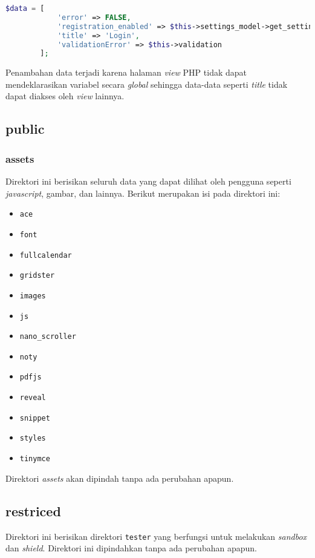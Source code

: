 \begin{lstlisting}[language=PHP, caption=Penambahan kode pada \textit{controller} \texttt{Login.php}, label=kode:loginControllerViewBab4]
	$data = [
			'error' => FALSE,
			'registration_enabled' => $this->settings_model->get_setting('enable_registration'),
			'title' => 'Login',
			'validationError' => $this->validation
		];
\end{lstlisting}

Penambahan data terjadi karena halaman \textit{view} PHP tidak dapat mendeklarasikan variabel secara \textit{global} sehingga data-data seperti \textit{title} tidak dapat diakses oleh \textit{view} lainnya.

\subsection{public}
	\subsubsection{assets}
	Direktori ini berisikan seluruh data yang dapat dilihat oleh pengguna seperti \textit{javascript}, gambar, dan lainnya. Berikut merupakan isi pada direktori ini:
	\begin{itemize}
		\item \texttt{ace}
		\item \texttt{font}
		\item \texttt{fullcalendar}
		\item \texttt{gridster}
		\item \texttt{images}
		\item \texttt{js}
		\item \texttt{nano\_scroller}
		\item \texttt{noty}
		\item \texttt{pdfjs}
		\item \texttt{reveal}
		\item \texttt{snippet}
		\item \texttt{styles}
		\item \texttt{tinymce}
	\end{itemize}
Direktori \textit{assets} akan dipindah tanpa ada perubahan apapun.

\subsection{restriced}
Direktori ini berisikan direktori \texttt{tester} yang berfungsi untuk melakukan \textit{sandbox} dan \textit{shield}. Direktori ini dipindahkan tanpa ada perubahan apapun.
